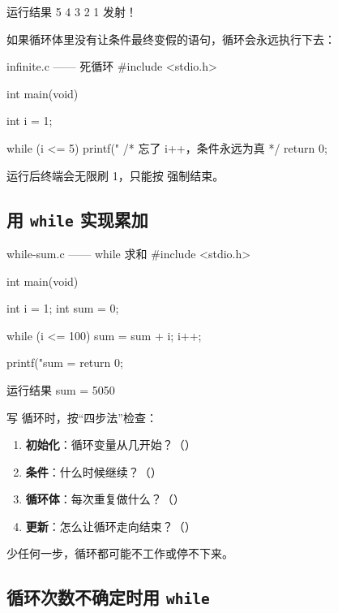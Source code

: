 \begin{outbox}{运行结果}
5
4
3
2
1
发射！
\end{outbox}

\begin{pitfall}[死循环]
如果循环体里没有让条件最终变假的语句，循环会永远执行下去：
\begin{codebox}{infinite.c —— 死循环}
#include <stdio.h>

int main(void)
{
    int i = 1;

    while (i <= 5) {
        printf("%
        /* 忘了 i++，条件永远为真 */
    }
    return 0;
}
\end{codebox}
运行后终端会无限刷 1，只能按  强制结束。
\end{pitfall}

\subsection{用 \texttt{while} 实现累加}

\begin{codebox}{while-sum.c —— while 求和}
#include <stdio.h>

int main(void)
{
    int i = 1;
    int sum = 0;

    while (i <= 100) {
        sum = sum + i;
        i++;
    }

    printf("sum = %
    return 0;
}
\end{codebox}

\begin{outbox}{运行结果}
sum = 5050
\end{outbox}

写  循环时，按“四步法”检查：

\begin{enumerate}
  \item \textbf{初始化}：循环变量从几开始？（）
  \item \textbf{条件}：什么时候继续？（）
  \item \textbf{循环体}：每次重复做什么？（）
  \item \textbf{更新}：怎么让循环走向结束？（）
\end{enumerate}

少任何一步，循环都可能不工作或停不下来。

\subsection{循环次数不确定时用 \texttt{while}}

